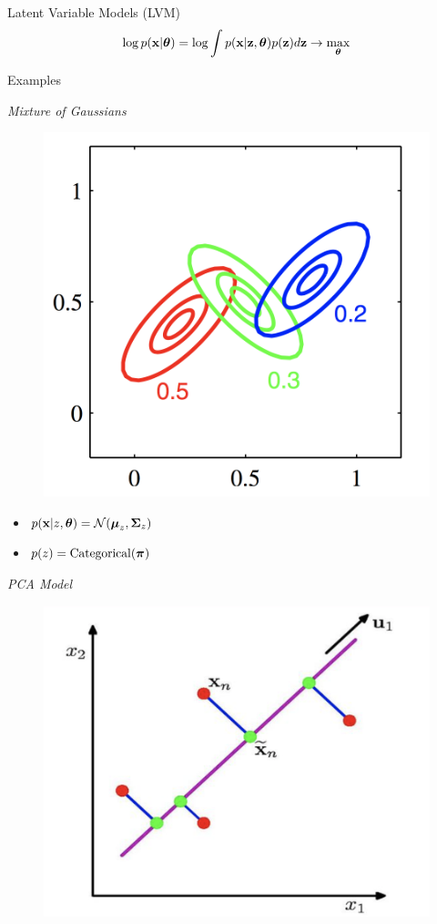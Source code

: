 \documentclass{beamer}
\begin{document}
\begin{frame}{Latent Variable Models (LVM)}
	\[
	\log p(\mathbf{x} | \boldsymbol{\theta}) = \log \int p(\mathbf{x} | \mathbf{z}, \boldsymbol{\theta}) p(\mathbf{z}) d\mathbf{z} \rightarrow \max_{\boldsymbol{\theta}}
	\]
	\vspace{-0.6cm}
	\begin{block}{Examples}
		\begin{minipage}[t]{0.45\columnwidth}
			\textit{Mixture of Gaussians} \\
			\vspace{-0.5cm}
			\begin{figure}
				\centering
				\includegraphics[width=0.75\linewidth]{figs/mixture_of_gaussians}
			\end{figure}
			\vspace{-0.5cm}
			\begin{itemize}
				\item $p(\mathbf{x} | z, \boldsymbol{\theta}) = \mathcal{N}(\boldsymbol{\mu}_z, \boldsymbol{\Sigma}_z)$
				\item $p(z) = \mathrm{Categorical}(\boldsymbol{\pi})$
			\end{itemize}
		\end{minipage}%
		\begin{minipage}[t]{0.53\columnwidth}
			\textit{PCA Model} \\
			\vspace{-0.5cm}
			\begin{figure}
				\centering
				\includegraphics[width=.7\linewidth]{figs/pca}

\end{figure}
\end{minipage}
\end{block}
\end{frame}
\end{document}
